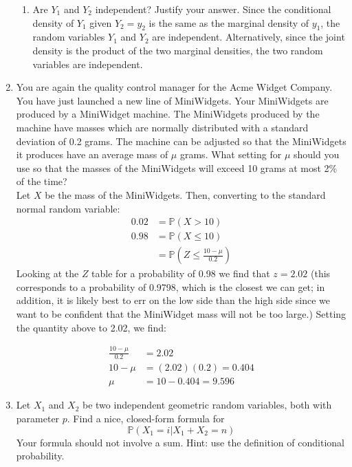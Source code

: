 \documentclass[12pt]{article}
\def\P{{\mathbb P}}
\begin{document}
\begin{enumerate}
\begin{enumerate}
\item Are $Y_1$ and $Y_2$ independent? Justify your answer.
Since the conditional density of $Y_1$ given $Y_2 = y_2$ is the same as the marginal density of $y_1$, the random variables $Y_1$ and $Y_2$ are independent. Alternatively, since the joint density is the product of the two marginal densities, the two random variables are independent.
\end{enumerate}

\item You are again the quality control manager for the Acme Widget Company. You have just launched a new line of MiniWidgets. Your MiniWidgets are produced by a MiniWidget machine. The MiniWidgets produced by the machine have masses which are normally distributed with a standard deviation of 0.2 grams. The machine can be adjusted so that the MiniWidgets it produces have an average mass of $\mu$ grams. What setting for $\mu$ should you use so that the masses of the MiniWidgets will exceed 10 grams at most 2\% of the time?\\

Let $X$ be the mass of the MiniWidgets. Then, converting to the standard normal random variable:
\begin{align*}
0.02 &= \P(X > 10) \\
0.98 &= \P(X \leq 10)\\
&= \P\left( Z \leq \frac{10 - \mu}{0.2} \right)
\end{align*}
Looking at the $Z$ table for a probability of 0.98 we find that $z = 2.02$ (this corresponds to a probability of 0.9798, which is the closest we can get; in addition, it is likely best to err on the low side than the high side since we want to be confident that the MiniWidget mass will not be too large.) Setting the quantity above to 2.02, we find:

\begin{align*}
\frac{10 - \mu}{0.2} &= 2.02 \\
10 - \mu &= (2.02)(0.2) = 0.404 \\
\mu &= 10 - 0.404 = 9.596
\end{align*}


\item Let $X_1$ and $X_2$ be two independent geometric random variables, both with parameter $p$. Find a nice, closed-form formula for
\[
\P(X_1 = i | X_1 + X_2 = n)
\]
Your formula should not involve a sum. Hint: use the definition of conditional probability.\\


\end{enumerate}
\end{document}
